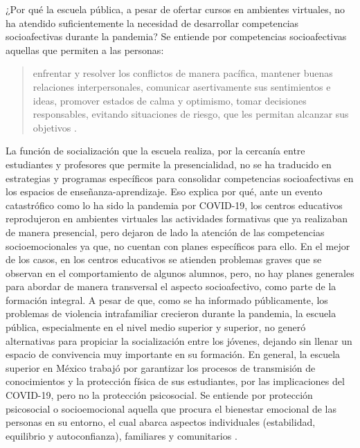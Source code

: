 \documentclass[spanish]{textolivre}
\begin{document}
¿Por qué la escuela pública, a pesar de ofertar cursos en ambientes virtuales, no ha atendido suficientemente la necesidad de desarrollar competencias socioafectivas durante la pandemia? Se entiende por competencias socioafectivas aquellas que permiten a las personas: 

\begin{quote}
enfrentar y resolver los conflictos de manera pacífica, mantener buenas relaciones interpersonales, comunicar asertivamente sus sentimientos e ideas, promover estados de calma y optimismo, tomar decisiones responsables, evitando situaciones de riesgo, que les permitan alcanzar sus objetivos \cite[p. 1]{romagnoli2007}. 
\end{quote}

La función de socialización que la escuela realiza, por la cercanía entre estudiantes y profesores que permite la presencialidad, no se ha traducido en estrategias y programas específicos para consolidar competencias socioafectivas en los espacios de enseñanza-aprendizaje. Eso explica por qué, ante un evento catastrófico como lo ha sido la pandemia por COVID-19, los centros educativos reprodujeron en ambientes virtuales las actividades formativas que ya realizaban de manera presencial, pero dejaron de lado la atención de las competencias socioemocionales ya que, no cuentan con planes específicos para ello. En el mejor de los casos, en los centros educativos se atienden problemas graves que se observan en el comportamiento de algunos alumnos, pero, no hay planes generales para abordar de manera transversal el aspecto socioafectivo, como parte de la formación integral.  A pesar de que, como se ha informado públicamente, los problemas de violencia intrafamiliar crecieron durante la pandemia, la escuela pública, especialmente en el nivel medio superior y superior, no generó alternativas para propiciar la socialización entre los jóvenes, dejando sin llenar un espacio de convivencia muy importante en su formación. En general, la escuela superior en México trabajó por garantizar los procesos de transmisión de conocimientos y la protección física de sus estudiantes, por las implicaciones del COVID-19, pero no la protección psicosocial. Se entiende por protección psicosocial o socioemocional aquella que procura el bienestar emocional de las personas en su entorno, el cual abarca aspectos individuales (estabilidad, equilibrio y autoconfianza), familiares y comunitarios \cite{lopez2021}.
\end{document}
